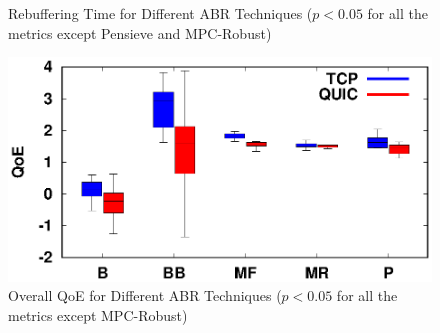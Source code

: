\begin{figure}[!t]
\begin{minipage}[t]{0.23\linewidth}
		\caption{\label{fig:RebufferTime_n}Rebuffering Time for Different ABR Techniques ($p<0.05$ for all the metrics except Pensieve and MPC-Robust)}
	\end{minipage}\hfill
	\begin{minipage}[t]{0.23\linewidth}
		\includegraphics[width=\linewidth]{img/newexp/qoe_box}
		\caption{\label{fig:QOE_n}Overall QoE for Different ABR Techniques ($p<0.05$ for all the metrics except MPC-Robust)}
	\end{minipage}
\end{figure}


